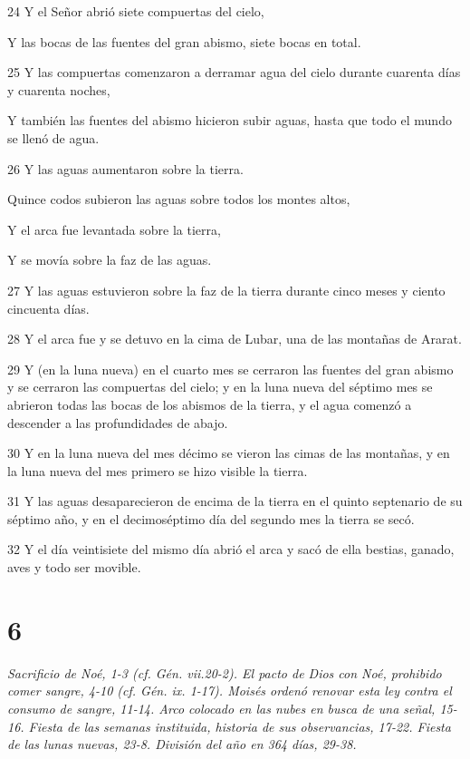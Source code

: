 \par 24 Y el Señor abrió siete compuertas del cielo,  
\par     Y las bocas de las fuentes del gran abismo, siete bocas en total.
\par 25 Y las compuertas comenzaron a derramar agua del cielo durante cuarenta días y cuarenta noches,  
\par     Y también las fuentes del abismo hicieron subir aguas, hasta que todo el mundo se llenó de agua.
\par 26 Y las aguas aumentaron sobre la tierra.  
\par     Quince codos subieron las aguas sobre todos los montes altos,  
\par     Y el arca fue levantada sobre la tierra,  
\par     Y se movía sobre la faz de las aguas.
\par 27 Y las aguas estuvieron sobre la faz de la tierra durante cinco meses y ciento cincuenta días.
\par 28 Y el arca fue y se detuvo en la cima de Lubar, una de las montañas de Ararat.
\par 29 Y (en la luna nueva) en el cuarto mes se cerraron las fuentes del gran abismo y se cerraron las compuertas del cielo; y en la luna nueva del séptimo mes se abrieron todas las bocas de los abismos de la tierra, y el agua comenzó a descender a las profundidades de abajo.
\par 30 Y en la luna nueva del mes décimo se vieron las cimas de las montañas, y en la luna nueva del mes primero se hizo visible la tierra.
\par 31 Y las aguas desaparecieron de encima de la tierra en el quinto septenario de su séptimo año, y en el decimoséptimo día del segundo mes la tierra se secó.
\par 32 Y el día veintisiete del mismo día abrió el arca y sacó de ella bestias, ganado, aves y todo ser movible.

\chapter{6}

\par \textit{Sacrificio de Noé, 1-3 (cf. Gén. vii.20-2). El pacto de Dios con Noé, prohibido comer sangre, 4-10 (cf. Gén. ix. 1-17). Moisés ordenó renovar esta ley contra el consumo de sangre, 11-14. Arco colocado en las nubes en busca de una señal, 15-16. Fiesta de las semanas instituida, historia de sus observancias, 17-22. Fiesta de las lunas nuevas, 23-8. División del año en 364 días, 29-38.}

